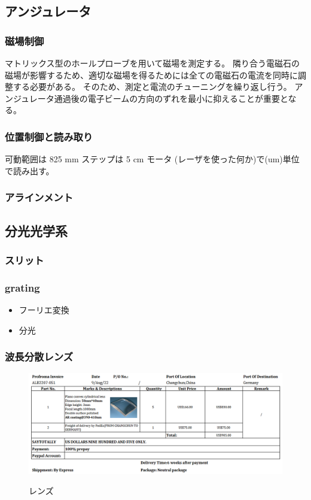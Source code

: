 \documentclass[a4paper,11pt,uplatex]{jsbook}
\begin{document}
\subsection{アンジュレータ}
\subsubsection{磁場制御}
マトリックス型のホールプローブを用いて磁場を測定する。
隣り合う電磁石の磁場が影響するため、適切な磁場を得るためには全ての電磁石の電流を同時に調整する必要がある。
そのため、測定と電流のチューニングを繰り返し行う。
アンジュレータ通過後の電子ビームの方向のずれを最小に抑えることが重要となる。

\subsubsection{位置制御と読み取り}
可動範囲は 825 mm
ステップは 5 cm
モータ
(レーザを使った何か)で(um)単位で読み出す。

\subsubsection{アラインメント}
\subsection{分光光学系}
\subsubsection{スリット}
\subsubsection{grating}
\begin{itemize}
  \item フーリエ変換
  \item 分光
\end{itemize}

\subsubsection{波長分散レンズ}
\begin{figure}[tb]
  \centering
  \includegraphics[width=0.8\linewidth]{image/3-lens.png}\\
  \caption{レンズ}
  \label{lens}
\end{figure}
\end{document}
